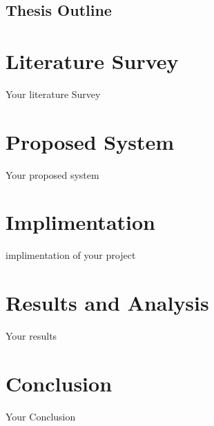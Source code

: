 \documentclass[10pt]{report}
\begin{document}
\section{Thesis Outline}

\newpage

\chapter{Literature Survey}

Your literature Survey

\newpage

\chapter{Proposed System}
Your proposed system
\newpage

\chapter{Implimentation}
implimentation of your project
\newpage

\chapter{Results and Analysis}

Your results

\newpage
\chapter{Conclusion}
Your Conclusion 
\newpage


\nocite{*}
\end{document}
